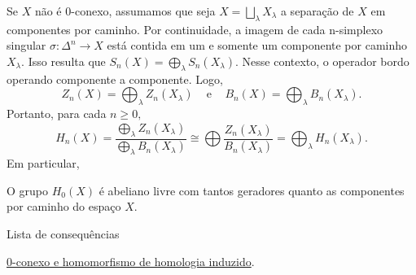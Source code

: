 Se $X$ não é 0-conexo, assumamos que seja $X=\bigsqcup_\lambda X_\lambda$ a separação de $X$ em componentes por caminho. Por continuidade, a imagem de cada n-simplexo singular $\sigma:\Delta^n\rightarrow X$ está contida em um e somente um componente por caminho $X_\lambda$. Isso resulta que $S_n(X)=\bigoplus_\lambda S_n(X_\lambda)$. Nesse contexto, o operador bordo operando componente a componente. Logo, 
\[Z_n(X)=\bigoplus_\lambda Z_n(X_\lambda)\;\;\;\text{ e }\;\;\;B_n(X)=\bigoplus_\lambda B_n(X_\lambda).\] 
Portanto, para cada $n\ge 0,$
\[H_n(X)=\frac{\bigoplus_\lambda Z_n(X_\lambda)}{\bigoplus_\lambda B_n(X_\lambda)}\cong\bigoplus\frac{Z_n(X_\lambda)}{B_n(X_\lambda)}=\bigoplus_\lambda H_n(X_\lambda
).\]
Em particular, 
\begin{corol}
    O grupo $H_0(X)$ é abeliano livre com tantos geradores quanto as componentes por caminho do espaço $X$.
\end{corol}

\begin{titlemize}{Lista de consequências}
    \item \hyperref[0-conexo-e-homomorfismo-de-homologia-induzido-prop]{0-conexo e homomorfismo de homologia induzido}.\\
\end{titlemize}
